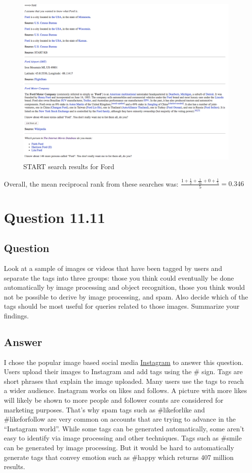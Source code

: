 \documentclass[10pt,letterpaper,bibliography=totoc]{scrartcl}
\begin{document}
\begin{figure}[h!]
\centering
\label{fig:start-ford}
\includegraphics[scale=.5]{start-ford.png}
\caption{START search results for Ford}
\end{figure}

Overall, the mean reciprocal rank from these searches was: 
$\frac{1 + \frac{1}{2} + \frac{1}{31} + 0 + \frac{1}{5}}{5} = 0.346 $

\section{Question 11.11}
\subsection{Question}
Look at a sample of images or videos that have been tagged by users and separate the tags into three groups: those you think could eventually be done automatically by image processing and object recognition, those you think would
not be possible to derive by image processing, and spam. Also decide which of the tags should be most useful for queries related to those images. Summarize your findings.

\subsection{Answer}
I chose the popular image based social media \href{www.instagram.com}{Instagram} to answer this question. Users upload their images to Instagram and add tags using the \# sign. Tags are short phrases that explain the image uploaded. Many users use the tags to reach a wider audience. Instagram works on likes and follows. A picture with more likes will likely be shown to more people and follower counts are considered for marketing purposes. That's why spam tags such as \#likeforlike and \#likeforfollow are very common on accounts that are trying to advance in the ``Instagram world''. While some tags can be generated automatically, some aren't easy to identify via image processing and other techniques. Tags such as \#smile can be generated by image processing. But it would be hard to automatically generate tags that convey emotion such as \#happy which returns 407 million results. 
\end{document}
